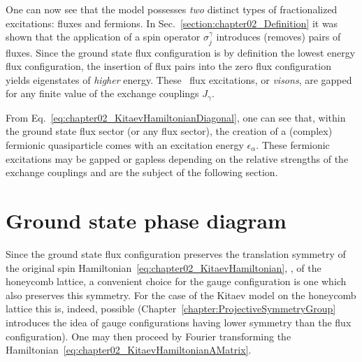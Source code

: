 One can now see that the model possesses \textit{two} distinct types of fractionalized excitations: fluxes and fermions.
In Sec.~\ref{section:chapter02_Definition} it was shown that the application of a spin operator $\sigma_j^{\gamma}$ introduces (removes) pairs of fluxes.
Since the ground state flux configuration is by definition the lowest energy flux configuration, the insertion of flux pairs into the zero flux configuration yields eigenstates of \textit{higher} energy.
These \ZZ~flux excitations, or \textit{visons}, are gapped for any finite value of the exchange couplings $J_{\gamma}$.

From Eq.~\eqref{eq:chapter02_KitaevHamiltonianDiagonal}, one can see that, within the ground state flux sector (or any flux sector), the creation of a (complex) fermionic quasiparticle comes with an excitation energy $\epsilon_{\alpha}$.
These fermionic excitations may be gapped or gapless depending on the relative strengths of the exchange couplings and are the subject of the following section.


%
%
\section{Ground state phase diagram}
\label{section:chapter02_GroundstatePhaseDiagram}
%
%
Since the ground state flux configuration preserves the translation symmetry of the original spin Hamiltonian~\eqref{eq:chapter02_KitaevHamiltonian}, \ie, of the honeycomb lattice, a convenient choice for the gauge configuration is one which also preserves this symmetry.
For the case of the Kitaev model on the honeycomb lattice this is, indeed, possible (Chapter~\ref{chapter:ProjectiveSymmetryGroup} introduces the idea of gauge configurations having lower symmetry than the flux configuration).
One may then proceed by Fourier transforming the Hamiltonian~\eqref{eq:chapter02_KitaevHamiltonianAMatrix}.

